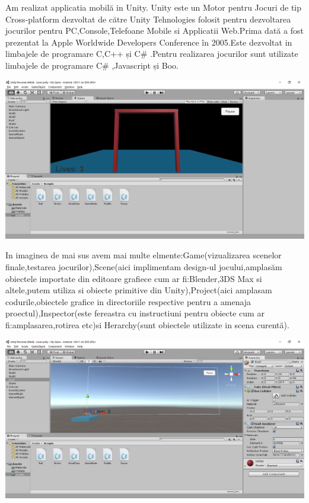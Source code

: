 Am realizat applicatia mobilă in Unity. Unity este un Motor pentru Jocuri de tip Cross-platform dezvoltat de către Unity Tehnologies folosit pentru dezvoltarea jocurilor pentru PC,Console,Telefoane Mobile si Applicatii Web.Prima dată a fost prezentat la Apple Worldwide Developers Conference în 2005.Este dezvoltat in limbajele de programare C,C++ și C\# .Pentru realizarea jocurilor sunt utilizate limbajele de programare C\# ,Javascript și Boo.\\
\begin{center}
\includegraphics[scale=0.5]{images/1}
\end{center}
In imaginea de mai sus avem mai multe elmente:Game(vizualizarea scenelor finale,testarea jocurilor),Scene(aici implimentam design-ul jocului,amplasăm obiectele importate din editoare grafiece cum ar fi:Blender,3DS Max si altele,putem utiliza si obiecte primitive din Unity),Project(aici amplasam codurile,obiectele grafice in directoriile respective pentru a amenaja proectul),Inspector(este fereastra cu instructiuni pentru obiecte cum ar fi:amplasarea,rotirea etc)si Herarchy(sunt obiectele utilizate in scena curentă).\\
\begin{center}
\includegraphics[scale=0.5]{images/2}\\
\end{center}
